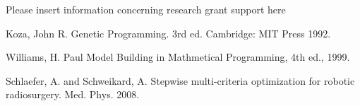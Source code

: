 \documentclass[USenglish,twocolumn]{article}
\begin{document}
\def\acknowledgementname{Funding}
\begin{acknowledgement}
Please insert information concerning research grant support here
\end{acknowledgement}

%
%

\begin{thebibliography}{9}



Koza, John R. Genetic Programming. 3rd ed. Cambridge: MIT Press 1992.

Williams, H. Paul Model Building in Mathmetical Programming, 4th ed., 1999.

Schlaefer, A. and Schweikard, A. Stepwise multi-criteria optimization for robotic radiosurgery. Med. Phys. 2008.



\end{thebibliography}
\end{document}
